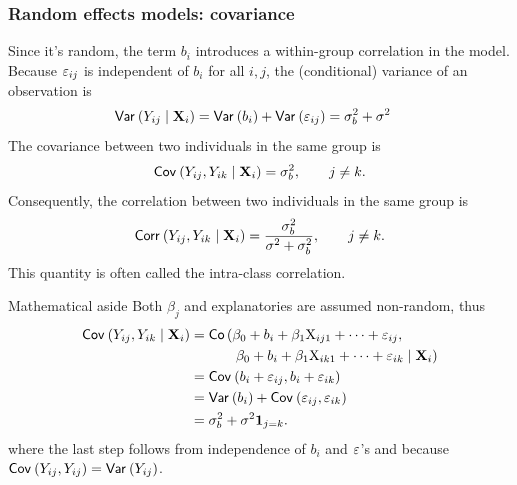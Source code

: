 \documentclass{beamer}
\begin{document}
\begin{frame}[fragile]
\frametitle{Random effects models: covariance}

Since it's random, the term $b_i$ introduces a \alert{within-group correlation in the model}. Because $\varepsilon_{ij}$ is independent of $b_i$ for all $i, j$, the (conditional) variance of an observation is
\begin{align*}
{\mathsf{Var}_{}}\left(Y_{ij}\mid \mathbf{X}_i\right)&={\mathsf{Var}_{}}\left(b_i\right)+{\mathsf{Var}_{}}\left(\varepsilon_{ij}\right)=\sigma^2_b + \sigma^2_{\vphantom{b}}
\end{align*}
The covariance between two individuals in the same group is
\begin{align*}
{\mathsf{Cov}_{}}\left(Y_{ij}, Y_{ik}\mid \mathbf{X}_i\right)=\sigma^2_b, \qquad j\neq k.
\end{align*}
Consequently, the correlation between two individuals in the same group is
\begin{align*}
{\mathsf{Corr}_{}}\left(Y_{ij}, Y_{ik}\mid \mathbf{X}_i\right)=\frac{\sigma^2_b}{\sigma^2_{\vphantom{b}}+\sigma^2_b}, \qquad  j\neq k.
\end{align*}
This quantity is often called the \alert{intra-class correlation}.

\end{frame}
\begin{frame}{Mathematical aside}
Both  $\beta_j$ and explanatories are assumed non-random, thus
 \begin{align*}
  {\mathsf{Cov}_{}}\left(Y_{ij}, Y_{ik} \mid \mathbf{X}_i\right) &= \mathsf{Co}\left(\beta_0 +b_i + \beta_1\mathrm{X}_{ij1}+\cdots + \varepsilon_{ij},\right.\\
  & \quad \qquad \left.\beta_0 +b_i + \beta_1\mathrm{X}_{ik1}+\cdots + \varepsilon_{ik} \mid \mathbf{X}_i\right)
  \\&= {\mathsf{Cov}_{}}\left(b_i+ \varepsilon_{ij}, b_i + \varepsilon_{ik}\right)
  \\&= {\mathsf{Var}_{}}\left(b_i\right) + {\mathsf{Cov}_{}}\left(\varepsilon_{ij}, \varepsilon_{ik}\right) \\&= \sigma^2_b +\sigma^2{\mathbf 1}_{j=k}.
\end{align*}
where the last step follows from independence of $b_i$ and $\varepsilon$'s and because ${\mathsf{Cov}_{}}\left(Y_{ij},Y_{ij}\right)={\mathsf{Var}_{}}\left(Y_{ij}\right)$.

\end{frame}
\end{document}
